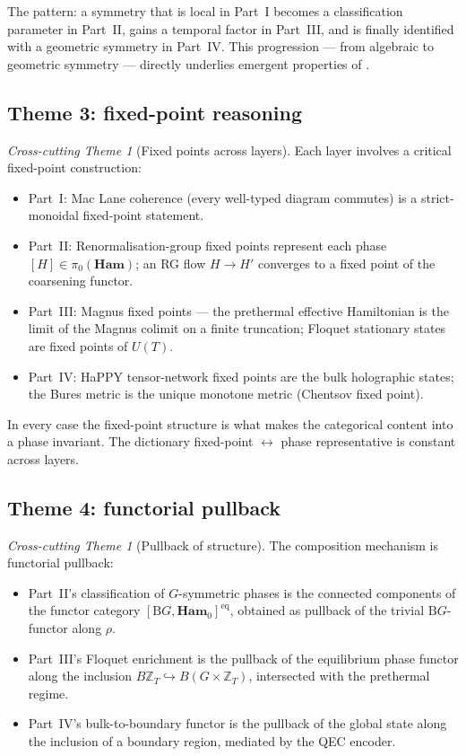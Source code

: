 \documentclass[12pt]{article}
\theoremstyle{definition}
\theoremstyle{remark}
\newtheorem{theme}[theorem]{Cross-cutting Theme}
\newcommand{\Ham}{\mathbf{Ham}}
\newcommand{\BG}{\mathrm{B}G}
\newcommand{\Z}{\mathbb{Z}}
\begin{document}
The pattern: a symmetry that is local in Part~I becomes a classification
parameter in Part~II, gains a temporal factor in Part~III, and is finally
identified with a geometric symmetry in Part~IV. This progression --- from
algebraic to geometric symmetry --- directly underlies emergent properties
 of .

\subsection{Theme 3: fixed-point reasoning}
\label{sec:theme-fp}

\begin{theme}[Fixed points across layers]
\label{theme:fp}
Each layer involves a critical fixed-point construction:
\begin{itemize}[leftmargin=2em]
\item Part~I: Mac Lane coherence (every well-typed diagram commutes) is a
  strict-monoidal fixed-point statement.
\item Part~II: Renormalisation-group fixed points represent each phase
  $[H] \in \pi_0(\Ham)$; an RG flow $H \to H'$ converges to a fixed point
  of the coarsening functor.
\item Part~III: Magnus fixed points --- the prethermal effective
  Hamiltonian is the limit of the Magnus colimit on a finite truncation;
  Floquet stationary states are fixed points of $U(T)$.
\item Part~IV: HaPPY tensor-network fixed points are the bulk holographic
  states; the Bures metric is the unique monotone metric (Chentsov fixed
  point).
\end{itemize}
\end{theme}

In every case the fixed-point structure is what makes the categorical
content into a phase invariant. The dictionary fixed-point $\leftrightarrow$ phase
representative is constant across layers.

\subsection{Theme 4: functorial pullback}
\label{sec:theme-pullback}

\begin{theme}[Pullback of structure]
\label{theme:pullback}
The composition mechanism is functorial pullback:
\begin{itemize}[leftmargin=2em]
\item Part~II's classification of $G$-symmetric phases is the connected
  components of the functor category $[\BG, \Ham_0]^{\mathrm{eq}}$,
  obtained as pullback of the trivial $\BG$-functor along $\rho$.
\item Part~III's Floquet enrichment is the pullback of the equilibrium
  phase functor along the inclusion $B\Z_T \hookrightarrow B(G \times
  \Z_T)$, intersected with the prethermal regime.
\item Part~IV's bulk-to-boundary functor is the pullback of the global
  state along the inclusion of a boundary region, mediated by the QEC
  encoder.
\end{itemize}
\end{theme}
\end{document}
